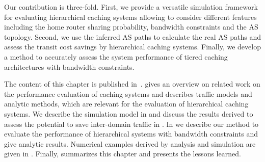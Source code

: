 Our contribution is three-fold.
First, we provide a versatile simulation framework for evaluating hierarchical caching systems allowing to consider different features including the home router sharing probability, bandwidth constraints and the AS topology.
Second, we use the inferred AS paths to calculate the real AS paths and assess the transit cost savings by hierarchical caching systems.
Finally, we develop a method to accurately assess the system performance of tiered caching architectures with bandwidth constraints.



The content of this chapter is published in~\cite{info3-inproceedings-2015-518,info3-inproceedings-2015-530,info3-inproceedings-2015-514,burger2016hierarchical}.
 gives an overview on related work on the performance evaluation of caching systems and describes traffic models and analytic methods, which are relevant for the evaluation of hierarchical caching systems.
We describe the simulation model in  and discuss the results derived to assess the potential to save inter-domain traffic in .
In  we describe our method to evaluate the performance of hierarchical systems with bandwidth constraints and give analytic results.
Numerical examples derived by analysis and simulation are given in .
Finally,  summarizes this chapter and presents the lessons learned.




%


% 

